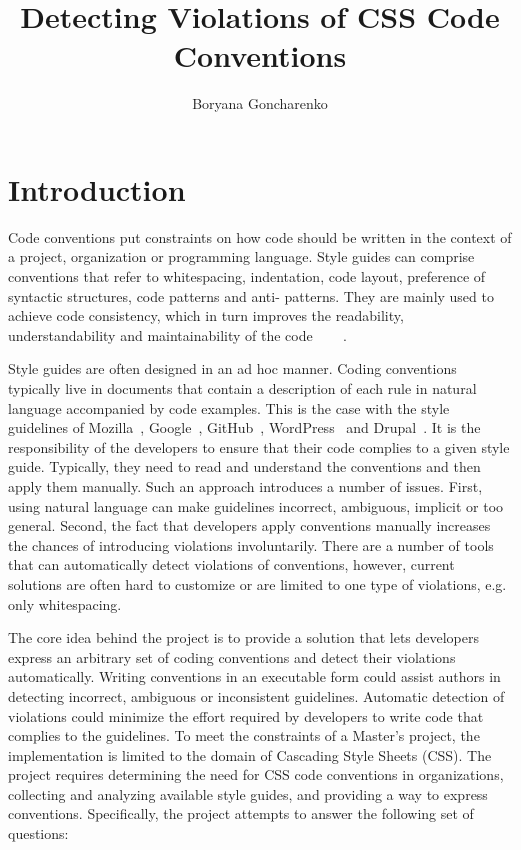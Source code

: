 \documentclass[parskip=full]{uvamscse}
\title{Detecting Violations of CSS Code Conventions}
\author{Boryana Goncharenko}
\begin{document}
\maketitle

\chapter{Introduction}

Code conventions put constraints on how code should be written in the context of a project,
organization or programming language. Style guides can comprise conventions that refer to
whitespacing, indentation, code layout, preference of syntactic structures, code patterns and anti-
patterns. They are mainly used to achieve code consistency, which in turn improves the readability,
understandability and maintainability of the code~\cite{Buse2010} ~\cite{buse2010learning}
~\cite{tenny1988program}.

Style guides are often designed in an ad hoc manner. Coding conventions typically live in documents
that contain a description of each rule in natural language accompanied by code examples. This is
the case with the style guidelines of Mozilla~\cite{Mozilla}, Google~\cite{Google},
GitHub~\cite{GitHub}, WordPress~\cite{Wordpress} and Drupal~\cite{Drupal}. It is the responsibility
of the developers to ensure that their code complies to a given style guide. Typically, they need to
read and understand the conventions and then apply them manually. Such an approach introduces a
number of issues. First, using natural language can make guidelines incorrect, ambiguous, implicit
or too general. Second, the fact that developers apply conventions manually increases the chances of
introducing violations involuntarily. There are a number of tools that can automatically detect
violations of conventions, however, current solutions are often hard to customize or are limited to
one type of violations, e.g. only whitespacing.

The core idea behind the project is to provide a solution that lets developers express an arbitrary
set of coding conventions and detect their violations automatically. Writing conventions
in an executable form could assist authors in detecting incorrect, ambiguous or inconsistent
guidelines. Automatic detection of violations could minimize the effort required by developers to
write code that complies to the guidelines. To meet the constraints of a Master’s project, the
implementation is limited to the domain of Cascading Style Sheets (CSS). The project requires
determining the need for CSS code conventions in organizations, collecting and analyzing available
style guides, and providing a way to express conventions. Specifically, the project attempts to
answer the following set of questions:
\end{document}
